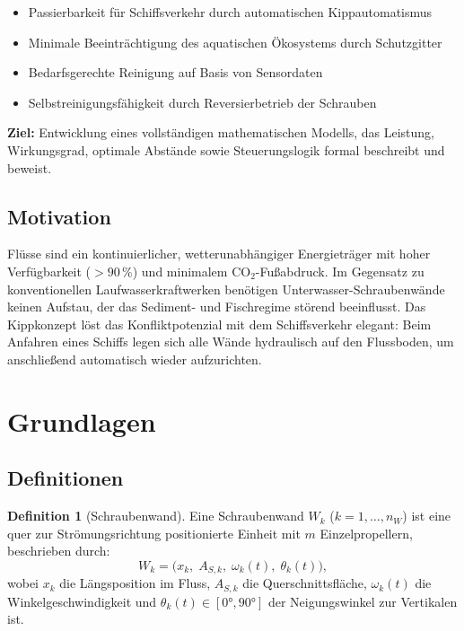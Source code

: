 ﻿\documentclass[a4paper,12pt]{article}
\theoremstyle{definition}
\newtheorem{definition}{Definition}
\begin{document}
\begin{itemize}
  \item Passierbarkeit für Schiffsverkehr durch automatischen Kippautomatismus
  \item Minimale Beeinträchtigung des aquatischen Ökosystems durch Schutzgitter
  \item Bedarfsgerechte Reinigung auf Basis von Sensordaten
  \item Selbstreinigungsfähigkeit durch Reversierbetrieb der Schrauben
\end{itemize}

\textbf{Ziel:} Entwicklung eines vollständigen mathematischen Modells, das Leistung,
Wirkungsgrad, optimale Abstände sowie Steuerungslogik formal beschreibt und beweist.

\subsection{Motivation}

Flüsse sind ein kontinuierlicher, wetterunabhängiger Energieträger mit hoher
Verfügbarkeit ($> 90\,\%$) und minimalem CO$_2$-Fußabdruck. Im Gegensatz zu
konventionellen Laufwasserkraftwerken benötigen Unterwasser-Schraubenwände keinen
Aufstau, der das Sediment- und Fischregime störend beeinflusst. Das Kippkonzept
löst das Konfliktpotenzial mit dem Schiffsverkehr elegant: Beim Anfahren eines Schiffs
legen sich alle Wände hydraulisch auf den Flussboden, um anschließend automatisch
wieder aufzurichten.

\section{Grundlagen}

\subsection{Definitionen}

\begin{definition}[Schraubenwand]
Eine Schraubenwand $W_k$ ($k = 1, \ldots, n_W$) ist eine quer zur Strömungsrichtung
positionierte Einheit mit $m$ Einzelpropellern, beschrieben durch:
\[
  W_k = \bigl(x_k,\; A_{S,k},\; \omega_k(t),\; \theta_k(t)\bigr),
\]
wobei $x_k$ die Längsposition im Fluss, $A_{S,k}$ die Querschnittsfläche, $\omega_k(t)$
die Winkelgeschwindigkeit und $\theta_k(t) \in [0 °, 90 °]$ der Neigungswinkel zur
Vertikalen ist.
\end{definition}
\end{document}
